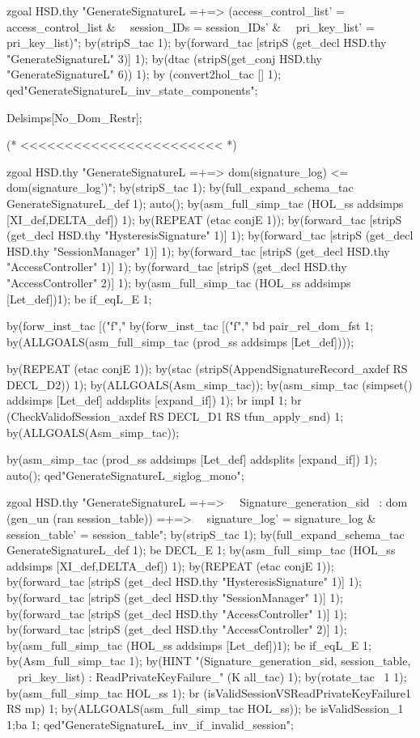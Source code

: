 \documentclass[a4paper,pdftex]{article}
\newenvironment{holz-proof}{\comment}{\endcomment}
\begin{document}
\begin{holz-proof}


zgoal HSD.thy 
"GenerateSignatureL =+=> (access_control_list' = access_control_list & \
\                        session_IDs = session_IDs'  &                 \
\                        pri_key_list' = pri_key_list)";
by(stripS_tac 1);
by(forward_tac [stripS (get_decl HSD.thy "GenerateSignatureL" 3)] 1);
by(dtac (stripS(get_conj HSD.thy "GenerateSignatureL" 6)) 1);
by (convert2hol_tac [] 1); 
qed"GenerateSignatureL_inv_state_components";


Delsimps[No_Dom_Restr];

(* <<<<<<<<<<<<<<<<<<<<<<< *)

zgoal HSD.thy 
"GenerateSignatureL =+=> dom(signature_log) <= dom(signature_log')";
by(stripS_tac 1);
by(full_expand_schema_tac GenerateSignatureL_def 1);
auto();
by(asm_full_simp_tac (HOL_ss addsimps [XI_def,DELTA_def]) 1); 
by(REPEAT (etac conjE 1));
by(forward_tac [stripS (get_decl HSD.thy "HysteresisSignature" 1)] 1);
by(forward_tac [stripS (get_decl HSD.thy "SessionManager" 1)] 1);
by(forward_tac [stripS (get_decl HSD.thy "AccessController" 1)] 1);
by(forward_tac [stripS (get_decl HSD.thy "AccessController" 2)] 1);
by(asm_full_simp_tac (HOL_ss addsimps [Let_def])1);
be if_eqL_E 1;

by(forw_inst_tac [("f","%
by(forw_inst_tac [("f","%
bd pair_rel_dom_fst 1;
by(ALLGOALS(asm_full_simp_tac (prod_ss addsimps [Let_def])));

by(REPEAT (etac conjE 1));
by(stac (stripS(AppendSignatureRecord_axdef RS DECL_D2)) 1);
by(ALLGOALS(Asm_simp_tac));
by(asm_simp_tac (simpset() addsimps [Let_def] addsplits [expand_if]) 1);
br impI 1;
br (CheckValidofSession_axdef RS DECL_D1 RS tfun_apply_snd) 1;
by(ALLGOALS(Asm_simp_tac));

by(asm_simp_tac (prod_ss addsimps [Let_def] addsplits [expand_if]) 1);
auto();
qed"GenerateSignatureL_siglog_mono";


zgoal HSD.thy 
"GenerateSignatureL =+=>                                            \
\ Signature_generation_sid ~: dom (gen_un (ran session_table)) =+=> \
\ signature_log' = signature_log & session_table' = session_table";
by(stripS_tac 1);
by(full_expand_schema_tac GenerateSignatureL_def 1);
be DECL_E 1;
by(asm_full_simp_tac (HOL_ss addsimps [XI_def,DELTA_def]) 1); 
by(REPEAT (etac conjE 1));
by(forward_tac [stripS (get_decl HSD.thy "HysteresisSignature" 1)] 1);
by(forward_tac [stripS (get_decl HSD.thy "SessionManager" 1)] 1);
by(forward_tac [stripS (get_decl HSD.thy "AccessController" 1)] 1);
by(forward_tac [stripS (get_decl HSD.thy "AccessController" 2)] 1);
by(asm_full_simp_tac (HOL_ss addsimps [Let_def])1);
be if_eqL_E 1;
by(Asm_full_simp_tac 1);
by(HINT "(Signature_generation_sid, session_table, \
        \ pri_key_list) : ReadPrivateKeyFailure_" (K all_tac) 1);
by(rotate_tac ~1 1);
by(asm_full_simp_tac HOL_ss 1);
br (isValidSessionVSReadPrivateKeyFailure1 RS mp) 1;
by(ALLGOALS(asm_full_simp_tac HOL_ss));
be isValidSession_1 1;ba 1;
qed"GenerateSignatureL_inv_if_invalid_session";



\end{holz-proof}
\end{document}
